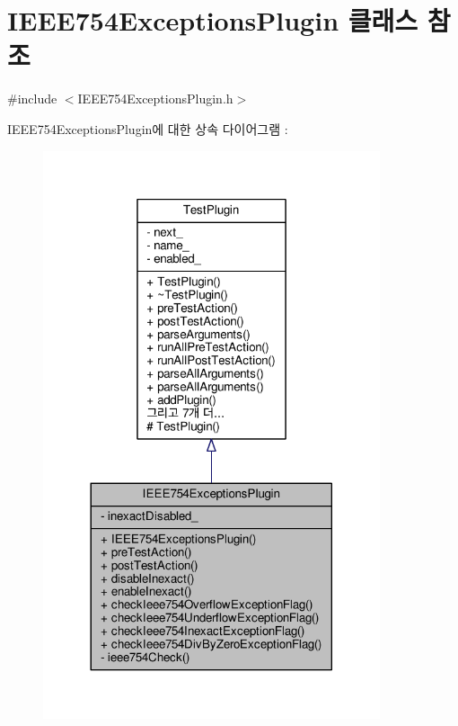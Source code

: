 \hypertarget{class_i_e_e_e754_exceptions_plugin}{}\section{I\+E\+E\+E754\+Exceptions\+Plugin 클래스 참조}
\label{class_i_e_e_e754_exceptions_plugin}


{\ttfamily \#include $<$I\+E\+E\+E754\+Exceptions\+Plugin.\+h$>$}



I\+E\+E\+E754\+Exceptions\+Plugin에 대한 상속 다이어그램 \+: 
\nopagebreak
\begin{figure}[H]
\begin{center}
\leavevmode
\includegraphics[width=281pt]{class_i_e_e_e754_exceptions_plugin__inherit__graph}
\end{center}
\end{figure}


